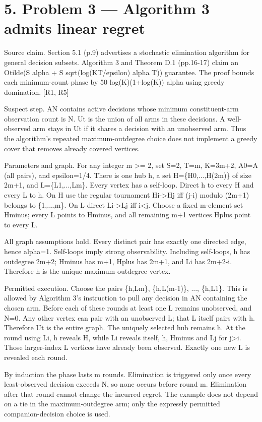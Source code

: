 \documentclass[10pt]{article}
\begin{document}
\section*{5. Problem 3 — Algorithm 3 admits linear regret}
Source claim. Section 5.1 (p.9) advertises a stochastic elimination algorithm for general decision subsets. Algorithm 3 and Theorem D.1 (pp.16-17) claim an Otilde(S alpha + S sqrt(log(KT/epsilon) alpha T)) guarantee. The proof bounds each minimum-count phase by 50 log(K)(1+log(K)) alpha using greedy domination. [R1, R5]\par
Suspect step. AN contains active decisions whose minimum constituent-arm observation count is N. Ut is the union of all arms in these decisions. A well-observed arm stays in Ut if it shares a decision with an unobserved arm. Thus the algorithm’s repeated maximum-outdegree choice does not implement a greedy cover that removes already covered vertices.\par
Parameters and graph. For any integer m >= 2, set S=2, T=m, K=3m+2, A0=A (all pairs), and epsilon=1/4. There is one hub h, a set H=\{H0,...,H(2m)\} of size 2m+1, and L=\{L1,...,Lm\}. Every vertex has a self-loop. Direct h to every H and every L to h. On H use the regular tournament Hi->Hj iff (j-i) modulo (2m+1) belongs to \{1,...,m\}. On L direct Li->Lj iff i<j. Choose a fixed m-element set Hminus; every L points to Hminus, and all remaining m+1 vertices Hplus point to every L.\par
All graph assumptions hold. Every distinct pair has exactly one directed edge, hence alpha=1. Self-loops imply strong observability. Including self-loops, h has outdegree 2m+2; Hminus has m+1, Hplus has 2m+1, and Li has 2m+2-i. Therefore h is the unique maximum-outdegree vertex.\par
Permitted execution. Choose the pairs \{h,Lm\}, \{h,L(m-1)\}, ..., \{h,L1\}. This is allowed by Algorithm 3’s instruction to pull any decision in AN containing the chosen arm. Before each of these rounds at least one L remains unobserved, and N=0. Any other vertex can pair with an unobserved L; that L itself pairs with h. Therefore Ut is the entire graph. The uniquely selected hub remains h. At the round using Li, h reveals H, while Li reveals itself, h, Hminus and Lj for j>i. Those larger-index L vertices have already been observed. Exactly one new L is revealed each round.\par
By induction the phase lasts m rounds. Elimination is triggered only once every least-observed decision exceeds N, so none occurs before round m. Elimination after that round cannot change the incurred regret. The example does not depend on a tie in the maximum-outdegree arm; only the expressly permitted companion-decision choice is used.\par
\end{document}
